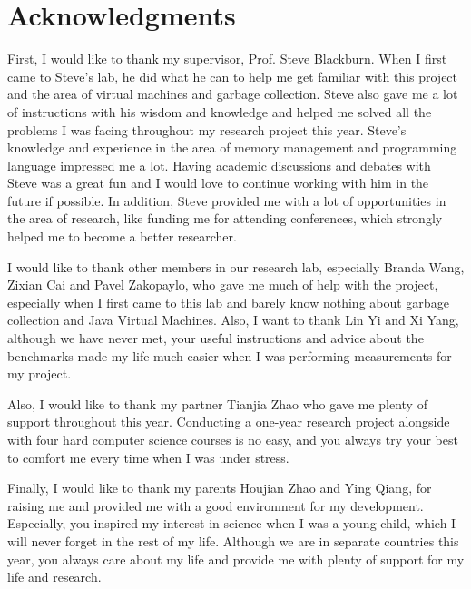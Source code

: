 \chapter*{Acknowledgments}

First, I would like to thank my supervisor, Prof. Steve Blackburn.
When I first came to Steve's lab, he did what he can to help me get familiar with
this project and the area of virtual machines and garbage collection.
Steve also gave me a lot of instructions with his wisdom and knowledge
and helped me solved all the problems I was facing throughout my research project this year.
Steve's knowledge and experience in the area of memory management and
programming language impressed me a lot.
Having academic discussions and debates with Steve was a great fun and
I would love to continue working with him in the future if possible.
In addition, Steve provided me with a lot of opportunities in the area of research,
like funding me for attending conferences, which strongly helped me to become a better researcher.

I would like to thank other members in our research lab, especially
Branda Wang, Zixian Cai and Pavel Zakopaylo, who gave me much of help
with the project,  especially when I first came to this lab and barely know nothing
about garbage collection and Java Virtual Machines.
Also, I want to thank Lin Yi and Xi Yang, although we have never met, your useful
instructions and advice about the benchmarks made my life much easier when I was
performing measurements for my project.

Also, I would like to thank my partner Tianjia Zhao who gave me plenty of support throughout this year.
Conducting a one-year research project alongside with four hard computer science courses is no easy,
and you always try your best to comfort me every time when I was under stress.

Finally, I would like to thank my parents Houjian Zhao and Ying Qiang, 
for raising me and provided me with a good environment for my development.
Especially, you inspired my interest in science when I was a young child,
which I will never forget in the rest of my life.
Although we are in separate countries this year,
you always care about my life and provide me with plenty of support for my life and research.

